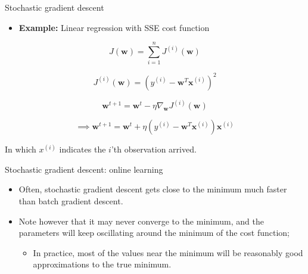 \documentclass[serif, aspectratio=169]{beamer}
\begin{document}
\begin{frame}{Stochastic gradient descent}

    \begin{itemize}
        \item \textbf{Example:} Linear regression with SSE cost function
    \end{itemize}
    \[
    J(\mathbf{w}) = \sum_{i=1}^{n} J^{(i)}(\mathbf{w})
    \]

    \[
    J^{(i)}(\mathbf{w}) = \left( y^{(i)} - \mathbf{w}^T \mathbf{x}^{(i)} \right)^2
    \]

    \[
    \mathbf{w}^{t+1} = \mathbf{w}^t - \eta \nabla_{\mathbf{w}} J^{(i)}(\mathbf{w})
    \]

    \[
    \implies \mathbf{w}^{t+1} = \mathbf{w}^t + \eta \left( y^{(i)} - \mathbf{w}^T \mathbf{x}^{(i)} \right) \mathbf{x}^{(i)}
    \]

    \begin{center}
        In which \( x^{(i)} \) indicates the \(i\)'th observation arrived.
    \end{center}

\end{frame}



\begin{frame}{Stochastic gradient descent: online learning}

    \begin{itemize}
        \item Often, stochastic gradient descent gets close to the minimum much faster than batch gradient descent.
        \item Note however that it may never converge to the minimum, and the parameters will keep oscillating around the minimum of the cost function;
        \begin{itemize}
            \item In practice, most of the values near the minimum will be reasonably good approximations to the true minimum.
        \end{itemize}
    \end{itemize}

\end{frame}
\end{document}
